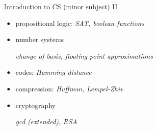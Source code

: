 \begin{slide}{Introduction to CS (minor subject) II}

\begin{itemize}
\item
  propositional logic: \emph{SAT, boolean functions}
\item
  number systems

  \emph{change of basis, floating point approximations}
\item
  codes: \emph{Hamming-distance}
\item
  compression: \emph{Huffman, Lempel-Zhiv}
\item
  cryptography

  \emph{gcd (extended), RSA}
\end{itemize}

\end{slide}








